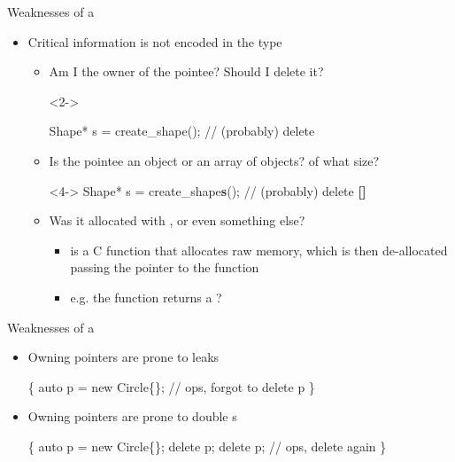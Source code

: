 \begin{frame}[fragile]{Weaknesses of a }

  \begin{itemize}
  \item<1-> Critical information is not encoded in the type
    \begin{itemize}
    \item<2-> Am I the owner of the pointee? Should I delete it?
      \begin{codeblock}<2->{
Shape* s = create_shape();               // (probably) delete

}\end{codeblock}

    \item<4-> Is the pointee an object or an array of objects? of what size?
      \begin{codeblock}<4->{
Shape* s = create_shape\textbf{s}();               // (probably) delete \textbf{[]}}\end{codeblock}

    \item<5-> Was it allocated with ,  or even something
      else?
      \begin{itemize}
      \item {} is a C function that allocates raw memory, which is
        then de-allocated passing the pointer to the function 
      \item e.g. the  function returns a ?
      \end{itemize}

    \end{itemize}
  \end{itemize}
\end{frame}

\begin{frame}[fragile]{Weaknesses of a  \insertcontinuationtext}

  \begin{itemize}
  \item Owning pointers are prone to leaks
    \begin{codeblock}
\{
  auto p = new Circle\{\ddd\};
  \ddd
  // ops, forgot to delete p
\}\end{codeblock}

  \item<2-> Owning pointers are prone to double s
    \begin{codeblock}
\{
  auto p = new Circle\{\ddd\};
  \ddd
  delete p;
  \ddd
  delete p; // ops, delete again
\}\end{codeblock}

  \end{itemize}
\end{frame}

